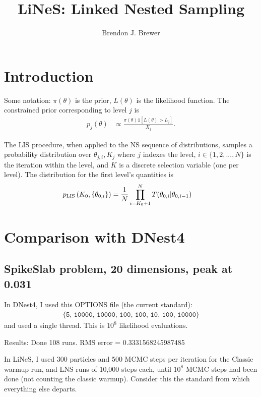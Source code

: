 \documentclass[a4paper, 12pt]{article}
\title{LiNeS: Linked Nested Sampling}
\author{Brendon J. Brewer}
\date{}
\begin{document}
\maketitle


\setlength{\parindent}{0pt}
\setlength{\parskip}{8pt}

\section{Introduction}
Some notation: $\pi(\theta)$ is the prior, $L(\theta)$ is the
likelihood function. The constrained prior corresponding
to level $j$ is
\begin{align}
p_j(\theta) &\propto
\frac{\pi(\theta)\mathds{1}\left[L(\theta) > L_j\right]}
{X_j}.
\end{align}

The LIS procedure, when applied to the NS sequence of
distributions, samples a probability distribution over
$\theta_{j,i}, K_j$ where $j$ indexes the level,
$i \in \{1, 2, ..., N\}$ is the
iteration within the level, and $K$ is a discrete
selection variable (one per level). The distribution for the
first level's quantities is
\begin{align}
p_{\rm LIS}\left(K_0, \left\{\theta_{0,i}\right\}\right)
&= \frac{1}{N} \prod_{i=K_0+1}^N T(\theta_{0,i} | \theta_{0,i-1})
\end{align}


\section{Comparison with DNest4}

\subsection{SpikeSlab problem, 20 dimensions, peak at 0.031}
In DNest4, I used this OPTIONS file (the current standard):
\begin{align}
\{\texttt{5, 10000, 10000, 100, 100, 10, 100, 10000}\}
\end{align}
and used
a single thread. This is $10^8$ likelihood evaluations.

Results:
Done 108 runs. RMS error = 0.3331568245987485

In LiNeS, I used 300 particles and 500 MCMC steps per iteration
for the Classic warmup run, and
LNS runs of 10,000 steps each, until $10^8$ MCMC steps
had been done (not counting the classic warmup).
Consider this the standard from which everything else
departs.
\end{document}
